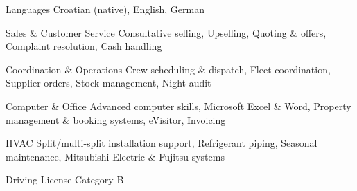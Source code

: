 

\begin{cvskills}

\cvskill
  {Languages}
  {Croatian (native), English, German}

\cvskill
  {Sales \& Customer Service}
  {Consultative selling, Upselling, Quoting \& offers, Complaint resolution, Cash handling}

\cvskill
  {Coordination \& Operations}
  {Crew scheduling \& dispatch, Fleet coordination, Supplier orders, Stock management, Night audit}

\cvskill
  {Computer \& Office}
  {Advanced computer skills, Microsoft Excel \& Word, Property management \& booking systems, eVisitor, Invoicing}

\cvskill
  {HVAC}
  {Split/multi-split installation support, Refrigerant piping, Seasonal maintenance, Mitsubishi Electric \& Fujitsu systems}

\cvskill
  {Driving License}
  {Category B}

\end{cvskills}
